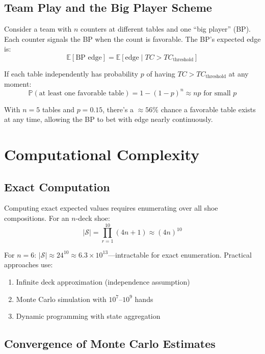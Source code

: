\documentclass[11pt,a4paper]{article}
\theoremstyle{definition}
\newcommand{\E}{\mathbb{E}}
\newcommand{\Prob}{\mathbb{P}}
\begin{document}
\subsection{Team Play and the Big Player Scheme}

Consider a team with $n$ counters at different tables and one ``big player'' (BP). Each counter signals the BP when the count is favorable. The BP's expected edge is:
\begin{equation}
\E[\text{BP edge}] = \E[\text{edge} \mid TC > TC_{\text{threshold}}]
\end{equation}

If each table independently has probability $p$ of having $TC > TC_{\text{threshold}}$ at any moment:
\[
\Prob(\text{at least one favorable table}) = 1 - (1-p)^n \approx np \text{ for small } p
\]

With $n = 5$ tables and $p = 0.15$, there's a $\approx 56\%$ chance a favorable table exists at any time, allowing the BP to bet with edge nearly continuously.

\section{Computational Complexity}

\subsection{Exact Computation}

Computing exact expected values requires enumerating over all shoe compositions. For an $n$-deck shoe:
\begin{equation}
|\mathcal{S}| = \prod_{r=1}^{10} (4n + 1) \approx (4n)^{10}
\end{equation}

For $n = 6$: $|\mathcal{S}| \approx 24^{10} \approx 6.3 \times 10^{13}$---intractable for exact enumeration. Practical approaches use:
\begin{enumerate}[nosep]
\item Infinite deck approximation (independence assumption)
\item Monte Carlo simulation with $10^7$--$10^9$ hands
\item Dynamic programming with state aggregation
\end{enumerate}

\subsection{Convergence of Monte Carlo Estimates}
\end{document}
